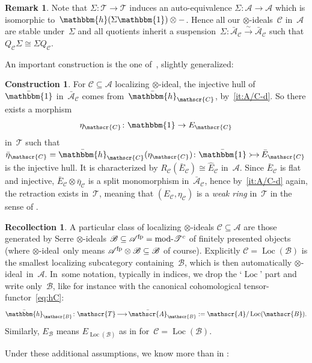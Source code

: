 \documentclass[JEP,XML,SOM,Unicode]{cedram}
\makeatletter
\newcommand{\into}{\mathchoice{\xymatrix@=.5cm{\ar@{>->}[r]&}}
{\xymatrix@=.3cm{\ar@{>->}[r]&}\hspace*{-1mm}}
{\hspace*{-1mm}\xymatrix@=.25cm{\ar@{>->}[r]&}\hspace*{-1.5mm}}
{\xymatrix@=.1cm{\ar@{>->}[r]&}\hspace*{-1mm}}
}
\numberwithin{equation}{section}
\theoremstyle{definition}
\newtheorem{Cons}[equation]{Construction}
\newtheorem{Rem}[equation]{Remark}
\newtheorem{Rec}[equation]{Recollection}
\newcommand{\cat}[1]{\mathscr{#1}}
\newcommand{\isoto}{\overset{\sim}{\longrightarrow}}
\newcommand{\too}{\mathop{\longrightarrow}\limits}
\newcommand{\unit}{\mathbbm{1}}
\DeclareMathOperator{\Loc}{Loc}
\DeclareMathOperator{\modname}{mod}
\newcommand{\AC}{\bar{\cA}_{\cC}}
\newcommand{\bat}[1]{\bar{\cat{#1}}}
\newcommand{\bEC}{\bar E_{\cC}}
\newcommand{\boneda}{\bar\yoneda}
\newcommand{\cA}{\cat{A}}
\newcommand{\cB}{\cat{B}}
\newcommand{\cC}{\cat{C}}
\newcommand{\cT}{\cat{T}}
\newcommand{\EB}{E_{\cB}}
\newcommand{\EC}{E_{\cC}}
\newcommand{\fp}{^{\textup{fp}}}
\newcommand{\hC}{\boneda_{\cC}}
\newcommand{\hEC}{\hat E_{\cC}}
\newcommand{\modd}{\modname\text{\!-}}
\newcommand{\mT}{\modd\cat T^c}
\newcommand{\tensids}{$\otimes$\nobreakdash-ideals}
\newcommand{\tensid}{$\otimes$\nobreakdash-ideal}
\newcommand{\yoneda}{\mathbbm{h}}
\makeatother
\begin{document}
\begin{Rem}
\label{Rem:Sigma}
Note that $\Sigma\colon \cT\to \cT$ induces an auto-equivalence $\Sigma\colon \cA\to \cA$ which is isomorphic to~$\yoneda(\Sigma\unit)\otimes-$. Hence all our \tensids~$\cC$ in~$\cA$ are stable under~$\Sigma$ and all quotients inherit a suspension~$\Sigma\colon \AC\isoto \AC$ such that $Q_\cC\Sigma\cong\Sigma Q_\cC$.
\end{Rem}

An important construction is the one of~\cite[\S3]{BalmerKrauseStevenson19}, slightly generalized:
\begin{Cons}
\label{Cons:E_C}
For $\cC\subseteq\cA$ localizing \tensid, the injective hull of~$\bar{\unit}$ in~$\AC$ comes from~$\hC$, by \,\eqref{it:A/C-d}. So there exists a morphism
\[
\eta_\cC\colon \unit\to \EC
\]
in~$\cT$ such that $\bar\eta_\cC=\hC(\eta_\cC)\colon \bar{\unit}\into \bar E_\cC$ is the injective hull. It is characterized by $R_\cC(\bEC)\cong\hEC$ in~$\cA$. Since $\bEC$ is flat and injective, $\bEC\otimes\bar\eta_{\cC}$ is a split monomorphism in~$\AC$, hence by \,\eqref{it:A/C-d} again, the retraction exists in~$\cT$, meaning that $(\EC,\eta_\cC)$ is a \emph{weak ring} in~$\cT$ in the sense of .
\end{Cons}

\begin{Rec}
\label{Rec:A/B}
A particular class of localizing $\otimes$-ideals $\cC\subseteq\cA$ are those generated by Serre $\otimes$-ideals $\cB\subseteq\cA\fp=\mT$ of finitely presented objects (where \tensid\ only means $\cA\fp\otimes\cB\subseteq\cB$ of course). Explicitly $\cC=\Loc(\cB)$ is the smallest localizing subcategory containing~$\cB$, which is then automatically \tensid\ in~$\cA$. In~some notation, typically in indices, we drop the `$\Loc$' part and write only~$\cB$, like for instance with the canonical cohomological tensor-functor~\eqref{eq:hC}:
\begin{equation}
\label{eq:hB}
\boneda_{\cB}\colon \cT\too \bat{A}_\cB:=\cat{A}/\Loc(\cB).
\end{equation}
Similarly, $\EB$ means $E_{\Loc(\cB)}$ as in  for~$\cC=\Loc(\cB)$.
\end{Rec}

Under these additional assumptions, we know more than in :
\end{document}
